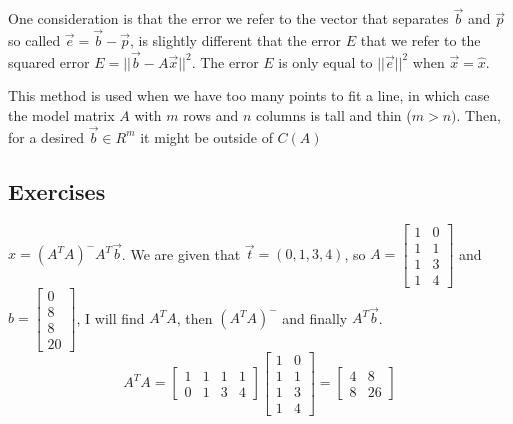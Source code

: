One consideration is that the error we refer to the vector that separates $\vec b$ and $\vec p$ so called $\vec e = \vec b - \vec p$, is slightly different that the error $E$ that we refer to the squared error $E = ||\vec b - A\vec x||^2$. The error $E$ is only equal to $||\vec e||^2$ when $\vec x = \hat x$.

This method is used when we have too many points to fit a line, in which case the model matrix $A$ with $m$ rows and $n$ columns is tall and thin ($m > n)$. Then, for a desired $\vec b \in R^m$ it might be outside of $C(A)$

\subsection{Exercises}

\begin{exercise}
    $\hat x = (A^T A)^- A^T \vec b$. We are given that $\vec t = (0,1,3,4)$, so $ A = \begin{bmatrix} 
            1 & 0 \\
            1 & 1 \\
            1 & 3 \\
            1 & 4
        \end{bmatrix}$
    and $b = \begin{bmatrix}
            0 \\
            8 \\
            8 \\
            20
    \end{bmatrix}$, I will find $A^T A$, then $(A^T A)^-$ and finally $A^T \vec b$.
    \begin{equation} %
        A^T A = \begin{bmatrix}
            1 & 1 & 1 & 1 \\
            0 & 1 & 3 & 4
        \end{bmatrix}
        \begin{bmatrix}
            1 & 0 \\
            1 & 1 \\
            1 & 3 \\
            1 & 4
        \end{bmatrix} = \begin{bmatrix}
            4 & 8 \\
            8 & 26
        \end{bmatrix}
    \end{equation} %
    \begin{equation} %

\end{equation}
\end{exercise}
